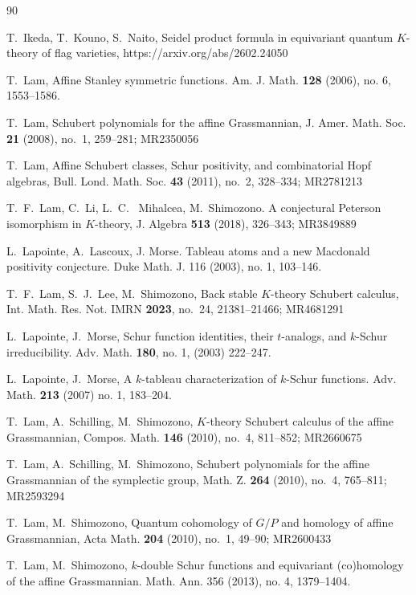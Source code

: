 \documentclass[a4paper]{amsart}
\theoremstyle{remark}
\numberwithin{equation}{section}
\begin{document}
\begin{thebibliography}{90}

 T.~Ikeda, T.~Kouno, S.~Naito, Seidel product formula in equivariant quantum $K$-theory of flag varieties, https://arxiv.org/abs/2602.24050 


 T.~Lam, Affine Stanley symmetric functions. 
Am. J. Math. \textbf{128} (2006), no. 6, 1553--1586.

 T.~Lam, Schubert polynomials for the affine Grassmannian, J. Amer. Math. Soc. {\bf 21} (2008), no.~1, 259--281; MR2350056

 T.~Lam, Affine Schubert classes, Schur positivity, and combinatorial Hopf algebras, Bull. Lond. Math. Soc. {\bf 43} (2011), no.~2, 328--334; MR2781213

 T.~F.~Lam, C.~Li, L.~C.~ Mihalcea, M.~Shimozono. A conjectural Peterson isomorphism in $K$-theory, J. Algebra {\bf 513} (2018), 326--343; MR3849889

 L.~Lapointe, A.~Lascoux, J. Morse.
Tableau atoms and a new Macdonald positivity conjecture.
Duke Math. J. 116 (2003), no. 1, 103–146.

 T.~F.~Lam, S.~J.~Lee, 
M.~Shimozono, Back stable $K$-theory Schubert calculus, Int. Math. Res. Not. IMRN {\bf 2023}, no.~24, 21381--21466; MR4681291


 L.~Lapointe, J.~Morse, 
Schur function identities, their $t$-analogs, and $k$-Schur irreducibility.
Adv. Math. \textbf{180}, no. 1, (2003) 222--247.

 L.~Lapointe, J.~Morse, 
A $k$-tableau characterization of $k$-Schur functions.
Adv. Math. \textbf{213} (2007) no. 1, 183--204. 

 T.~Lam, A.~Schilling, M.~Shimozono, $K$-theory Schubert calculus of the affine Grassmannian, Compos. Math. {\bf 146} (2010), no.~4, 811--852; MR2660675

 T.~Lam, A.~Schilling, M.~Shimozono, Schubert polynomials for the affine Grassmannian of the symplectic group, Math. Z. {\bf 264} (2010), no.~4, 765--811; MR2593294


 T.~Lam, M.~Shimozono, Quantum cohomology of $G/P$ and homology of affine Grassmannian, Acta Math. {\bf 204} (2010), no.~1, 49--90; MR2600433

 T.~Lam, M.~Shimozono,
$k$-double Schur functions and equivariant (co)homology of the affine Grassmannian.
Math. Ann. 356 (2013), no. 4, 1379–1404.


\end{thebibliography}
\end{document}
